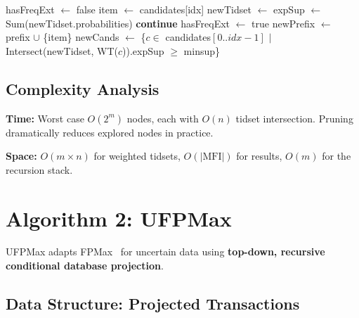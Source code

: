\documentclass[12pt,a4paper]{report}
\begin{document}
  \begin{algorithm}[H]
\caption{GenMax Procedure}
\begin{algorithmic}[1]
     
    \State \Return
    \EndIf
    \State hasFreqExt $\gets$ false
      \State item $\gets$ candidates[idx]
      \State newTidset $\gets$ 
      \State expSup $\gets$ Sum(newTidset.probabilities)
       
      \State \textbf{continue}
      \EndIf
      \State hasFreqExt $\gets$ true
      \State newPrefix $\gets$ prefix $\cup$ \{item\}
      \State newCands $\gets$ \{$c \in$ candidates$[0..idx{-}1]$ $|$ Intersect(newTidset, WT($c$)).expSup $\geq$ minsup\}
        \State {}
      \Else
        \State {}
      \EndIf
    \EndFor
      \State {}
    \EndIf
  \EndProcedure
\end{algorithmic}
  \end{algorithm}

  \subsection{Complexity Analysis}

  \textbf{Time:} Worst case $O(2^m)$ nodes, each with $O(n)$ tidset intersection. Pruning dramatically reduces explored nodes in practice.

  \textbf{Space:} $O(m \times n)$ for weighted tidsets, $O(|\text{MFI}|)$ for results, $O(m)$ for the recursion stack.

  \section{Algorithm 2: UFPMax}

  UFPMax adapts FPMax~\cite{grahne2003} for uncertain data using \textbf{top-down, recursive conditional database projection}.

  \subsection{Data Structure: Projected Transactions}
\end{document}
